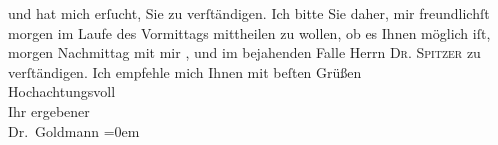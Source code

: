\begin{ledgroupsized}[t]{13cm}
               und hat mich erſucht, Sie zu verſtändigen. Ich bitte Sie daher, mir freundlichſt
                  morgen im Laufe des Vormittags
               mittheilen zu {\pb}wollen, ob es Ihnen
               möglich iſt, morgen{ }Nachmittag mit mir \label{K_L02641-1v}\label{K_L02641-1h}, und im bejahenden Falle Herrn \textsc{Dr. Spitzer} zu verſtändigen.\pend
           \pstart
           Ich empfehle mich Ihnen mit beſten Grüßen {\\[\baselineskip]}Hochachtungsvoll {\\[\baselineskip]}Ihr
               ergebener {\\[\baselineskip]}\spacefill\mbox{Dr. Goldmann}\pend
           \leftskip=0em{}\endnumbering{}\end{ledgroupsized}  \newcommand{\dateiname}{L02641}\newcommand{\titel}{Paul Goldmann an Arthur Schnitzler, 25. 6. 1889}\newcommand{\editorInnen}{Martin Anton Müller und Laura Untner}
      
